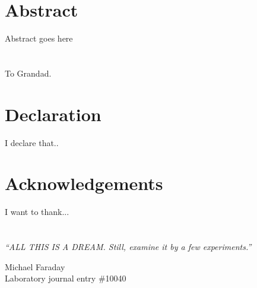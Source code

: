 

\chapter*{\centering Abstract}
Abstract goes here

\chapter*{\centering }%
\begin{center}
    \thispagestyle{empty}
    To Grandad.
\end{center}

\chapter*{\centering Declaration}
I declare that..

\chapter*{\centering Acknowledgements}
I want to thank...



\tableofcontents
\listoffigures
\listoftables
%
\chapter*{\centering }
\begin{center}
\epigraph{\textit{``ALL THIS IS A DREAM. Still, examine it by a few experiments.''}}{Michael Faraday\\ Laboratory journal entry \#10040}
\end{center}

\cleardoublepage
